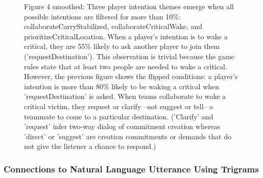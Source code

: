 \begin{figure}[h!]
    \centering
    \caption{Figure 4 smoothed: Three player intention themes emerge when all possible intentions are filtered for more than 10\%: collaborateCarryStabilized, collaborateCriticalWake, and prioritizeCriticalLocation. When a player's intention is to wake a critical, they are 55\% likely to ask another player to join
 them ('requestDestination'). This observation is trivial because the game rules state that at least two people are needed to wake a critical. However, the previous figure shows the flipped conditions: a player's intention is more than 80\% likely to be waking a critical when 'requestDestination' is asked. When teams collaborate to wake a critical victim, they request or clarify --not suggest or tell-- a teammate to come to a particular destination. ('Clarify' and 'request' infer two-way dialog of commitment creation whereas 'direct' or 'suggest' are creation commitments or demands that do not give the listener a chance to respond.)}
\end{figure}








\newpage

\subsubsection{Connections to Natural Language Utterance Using Trigrams}

